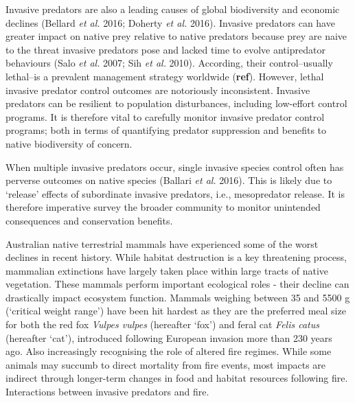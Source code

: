 \documentclass[11pt,a4paper,titlepage,twoside,openright]{style/unimelbthesis}
\begin{document}
\begin{mainmatter}
Invasive predators are also a leading causes of global biodiversity and economic declines (Bellard \emph{et al.} 2016; Doherty \emph{et al.} 2016). Invasive predators can have greater impact on native prey relative to native predators because prey are naive to the threat invasive predators pose and lacked time to evolve antipredator behaviours (Salo \emph{et al.} 2007; Sih \emph{et al.} 2010). According, their control--usually lethal--is a prevalent management strategy worldwide (\textbf{ref}). However, lethal invasive predator control outcomes are notoriously inconsistent. Invasive predators can be resilient to population disturbances, including low-effort control programs. It is therefore vital to carefully monitor invasive predator control programs; both in terms of quantifying predator suppression and benefits to native biodiversity of concern.

When multiple invasive predators occur, single invasive species control often has perverse outcomes on native species (Ballari \emph{et al.} 2016). This is likely due to `release' effects of subordinate invasive predators, i.e., mesopredator release. It is therefore imperative survey the broader community to monitor unintended consequences and conservation benefits.

Australian native terrestrial mammals have experienced some of the worst declines in recent history. While habitat destruction is a key threatening process, mammalian extinctions have largely taken place within large tracts of native vegetation. These mammals perform important ecological roles - their decline can drastically impact ecosystem function. Mammals weighing between 35 and 5500 g (`critical weight range') have been hit hardest as they are the preferred meal size for both the red fox \emph{Vulpes vulpes} (hereafter `fox') and feral cat \emph{Felis catus} (hereafter `cat'), introduced following European invasion more than 230 years ago. Also increasingly recognising the role of altered fire regimes. While some animals may succumb to direct mortality from fire events, most impacts are indirect through longer-term changes in food and habitat resources following fire. Interactions between invasive predators and fire.


\end{mainmatter}
\end{document}
